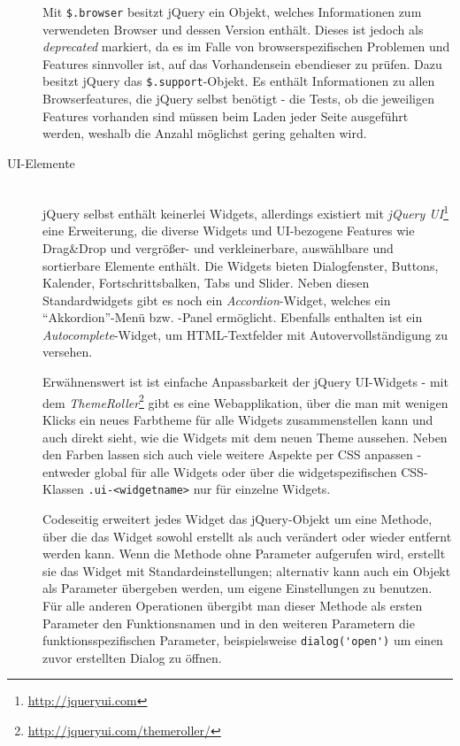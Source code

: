 \begin{description}
Mit \lstinline{$.browser} besitzt jQuery ein Objekt, welches Informationen zum verwendeten Browser
und dessen Version enthält. Dieses ist jedoch als \emph{deprecated} markiert, da es im Falle von
browserspezifischen Problemen und Features sinnvoller ist, auf das Vorhandensein ebendieser zu
prüfen. Dazu besitzt jQuery das \lstinline{$.support}-Objekt. Es enthält Informationen zu allen
Browserfeatures, die jQuery selbst benötigt - die Tests, ob die jeweiligen Features vorhanden sind
müssen beim Laden jeder Seite ausgeführt werden, weshalb die Anzahl möglichst gering gehalten wird.

\item[UI-Elemente] \hfill \\
jQuery selbst enthält keinerlei Widgets, allerdings existiert mit \emph{jQuery
UI}\footnote{\href{http://jqueryui.com}{http://jqueryui.com}} eine Erweiterung, die diverse Widgets
und UI-bezogene Features wie Drag\&Drop und vergrößer- und verkleinerbare, auswählbare und
sortierbare Elemente enthält. Die Widgets bieten Dialogfenster, Buttons, Kalender,
Fortschrittsbalken, Tabs und Slider. Neben diesen Standardwidgets gibt es noch ein
\emph{Accordion}-Widget, welches ein \enquote{Akkordion}-Menü bzw. -Panel ermöglicht. Ebenfalls
enthalten ist ein \emph{Autocomplete}-Widget, um HTML-Textfelder mit Autovervollständigung zu
versehen.


Erwähnenswert ist ist einfache Anpassbarkeit der jQuery UI-Widgets - mit dem
\emph{ThemeRoller}\footnote{\href{http://jqueryui.com/themeroller/}{http://jqueryui.com/themeroller/}}
gibt es eine Webapplikation, über die man mit wenigen Klicks ein neues Farbtheme für alle Widgets
zusammenstellen kann und auch direkt sieht, wie die Widgets mit dem neuen Theme aussehen. Neben den
Farben lassen sich auch viele weitere Aspekte per CSS anpassen - entweder global für alle Widgets
oder über die widgetspezifischen CSS-Klassen \lstinline{.ui-<widgetname>} nur für einzelne Widgets.

Codeseitig erweitert jedes Widget das jQuery-Objekt um eine Methode, über die das Widget sowohl
erstellt als auch verändert oder wieder entfernt werden kann. Wenn die Methode ohne Parameter
aufgerufen wird, erstellt sie das Widget mit Standardeinstellungen; alternativ kann auch ein Objekt
als Parameter übergeben werden, um eigene Einstellungen zu benutzen. Für alle anderen Operationen
übergibt man dieser Methode als ersten Parameter den Funktionsnamen und in den weiteren Parametern
die funktionsspezifischen Parameter, beispielsweise \lstinline{dialog('open')} um einen zuvor
erstellten Dialog zu öffnen.


\end{description}
